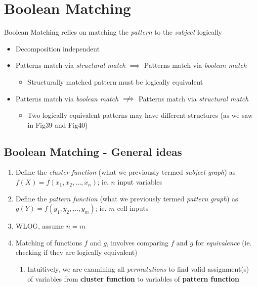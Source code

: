 \documentclass{article}
\begin{document}
\newpage
\section{Boolean Matching}
Boolean Matching relies on matching the \textit{pattern} to the \textit{subject} logically

\begin{itemize}
    \item Decomposition independent
    \item Patterns match via \textit{structural match} $\implies$ Patterns match via \textit{boolean match}
        \begin{itemize}
            \item Structurally matched pattern must be logically equivalent
        \end{itemize}
    \item Patterns match via \textit{boolean match} $\centernot \implies$ Patterns match via \textit{structural match}
        \begin{itemize}
            \item Two logically equivalent patterns may have different structures (as we saw in Fig39 and Fig40)
        \end{itemize}
\end{itemize}

\subsection{Boolean Matching - General ideas} 
\begin{enumerate}[label*=\arabic*.]
    \item Define the \textit{cluster function} (what we previously termed \textit{subject graph}) as $f(X) = f(x_{1},x_{2},\dots , x_{n})$; ie. $n$ input variables
    \item Define the \textit{pattern function} (what we previously termed \textit{pattern graph}) as $g(Y) = f(y_{1},y_{2},\dots , y_{m})$; ie. $m$ cell inputs
    \item WLOG, assume $n=m$
    \item Matching of functions $f$ and $g$, involves comparing $f$ and $g$ for \textit{equivalence} (ie. checking if they are logically equivalent)
        \begin{enumerate}[label*=\arabic*.]
            \item Intuitively, we are examining all \textit{permutations} to find valid assignment(s) of variables from \textbf{cluster function} to variables of \textbf{pattern function}
        \end{enumerate}
\end{enumerate}
\end{document}
